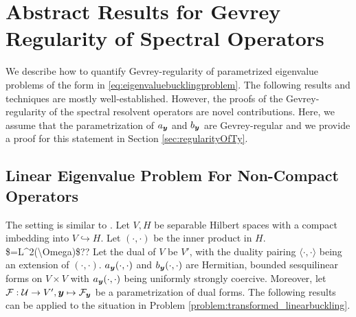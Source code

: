 \section{Abstract Results for Gevrey Regularity of Spectral Operators}\label{section:AbstractResults}
We describe how to quantify Gevrey-regularity of parametrized eigenvalue problems of the form in  \eqref{eq:eigenvaluebucklingproblem}. The following results and techniques are mostly well-established.
However, the proofs of the Gevrey-regularity of the spectral resolvent operators are novel contributions.
Here, we assume that the parametrization of $a_{\boldsymbol{y}}$ and $b_{\boldsymbol{y}}$ are Gevrey-regular and we provide a proof for this statement in Section \ref{sec:regularityOfTy}.
\subsection{Linear Eigenvalue Problem For Non-Compact Operators}\label{subsection:Tydefinition}
The setting is similar to \cite[Section 3]{DaugeandSuriNumericalapproximation}.
Let $V,H$ be separable Hilbert spaces with a compact imbedding into $V\hookrightarrow H$. Let $(\cdot,\cdot)$ be the inner product in $H$. \ac{$=L^2(\Omega)$??}
Let the dual of $V$ be $V'$, with the duality pairing $\langle \cdot, \cdot \rangle$ being an extension of $(\cdot,\cdot)$. 
$a_{{\boldsymbol{y}}}(\cdot,\cdot)$ and $b_{\boldsymbol{y}}(\cdot,\cdot)$  are Hermitian, bounded sesquilinear forms on $V\times V$ with $a_{\boldsymbol{y}}(\cdot,\cdot)$ being uniformly strongly coercive. Moreover, let $\mathcal{F} : \mathcal{U} \to V', {\boldsymbol{y}} \mapsto \mathcal{F}_{{\boldsymbol{y}}} $ be a parametrization of dual forms.
The following results can be applied to the situation in Problem \ref{problem:transformed_linearbuckling}.

